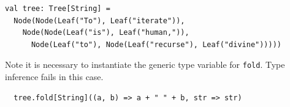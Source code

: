 \documentclass[a4paper,12pt,answers]{exam}
\begin{document}
\begin{questions}
\begin{parts}
\begin{Verbatim}
val tree: Tree[String] = 
  Node(Node(Leaf("To"), Leaf("iterate")),
    Node(Node(Leaf("is"), Leaf("human,")),
      Node(Leaf("to"), Node(Leaf("recurse"), Leaf("divine")))))	
\end{Verbatim}

\begin{solution}
Note it is necessary to instantiate the generic type variable for \verb!fold!. 
Type inference fails in this case.
\begin{Verbatim}
  tree.fold[String]((a, b) => a + " " + b, str => str)	
\end{Verbatim}
\end{solution}

\end{parts}

\end{questions}
\end{document}
